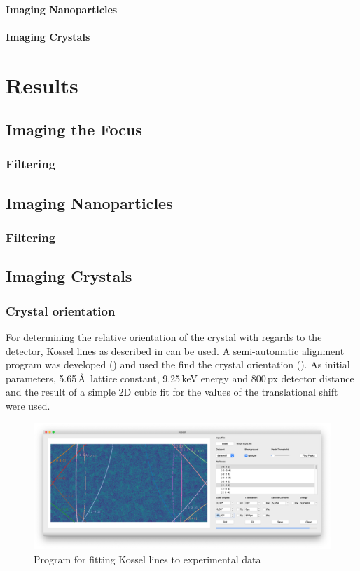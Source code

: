 \paragraph{Imaging Nanoparticles}
\paragraph{Imaging Crystals}

\section{Results}
\subsection{Imaging the Focus}
\subsubsection{Filtering}

\subsection{Imaging Nanoparticles}
\subsubsection{Filtering}
\subsection{Imaging Crystals}
\subsubsection{Crystal orientation}
For determining the relative orientation of the crystal with regards to the detector, Kossel lines as described in  can be used.  A semi-automatic alignment program was developed () and used the find the crystal orientation (). As initial parameters, 5.65\,\AA\, lattice constant, 9.25\,keV energy and 800\,px detector distance and the result of a simple 2D cubic fit for the values of the translational shift were used. 
\begin{figure}
\centering
\includegraphics[width=0.8\linewidth]{images/kosselfit.png}
\caption{Program for fitting Kossel lines to experimental data}
\label{fig:kosselfig}
\end{figure}


